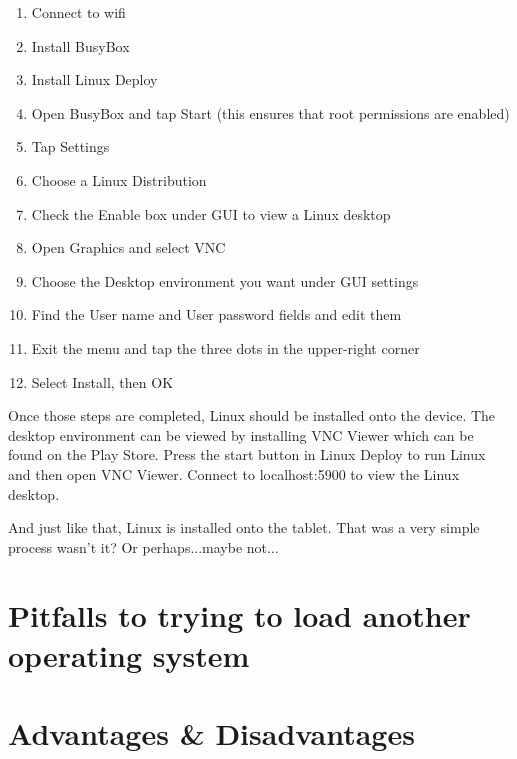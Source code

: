 \begin{enumerate}

\item Connect to wifi

\item Install BusyBox

\item Install Linux Deploy

\item Open BusyBox and tap Start (this ensures that root permissions are enabled)

\item Tap Settings

\item Choose a Linux Distribution

\item Check the Enable box under GUI to view a Linux desktop

\item Open Graphics and select VNC

\item Choose the Desktop environment you want under GUI settings

\item Find the User name and User password fields and edit them 

\item Exit the menu and tap the three dots in the upper-right corner

\item Select Install, then OK

\end{enumerate}

Once those steps are completed, Linux should be installed onto the device. The desktop environment can be viewed by installing VNC Viewer which 
can be found on the Play Store. Press the start button in Linux Deploy to run Linux and then open VNC Viewer. Connect to localhost:5900 to view 
the Linux desktop.

And just like that, Linux is installed onto the tablet. That was a very simple process wasn't it? Or perhaps...maybe not...

\section{Pitfalls to trying to load another operating system}


\section{Advantages & Disadvantages}
